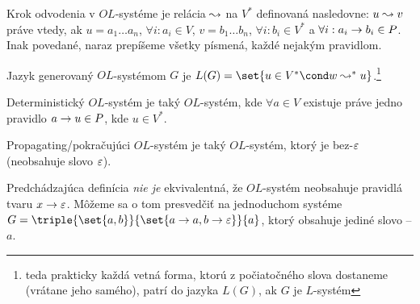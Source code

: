 \begin{definicia}
  Krok odvodenia v $OL$-systéme je relácia $\leadsto$ na $V^{*}$ definovaná
  nasledovne: $u \leadsto v$ práve vtedy, ak $u = a_{1} \dots a_{n}$,
  $\forall i: a_{i} \in V$, $v = b_{1} \dots b_{n}$, 
  $\forall i: b_{i} \in V^{*}$ a 
  $\forall i: a_{i} \rightarrow b_{i} \in P$. 
  Inak povedané, naraz prepíšeme všetky písmená, každé nejakým
  pravidlom.
\end{definicia}

\begin{definicia}
  Jazyk generovaný $OL$-systémom $G$ je 
  $L(G) = \set{u \in V^{*} \cond w \odvodenie^{*} u}$.\footnote{
    teda prakticky každá vetná forma,
    ktorú z počiatočného slova dostaneme (vrátane jeho samého),
    patrí do jazyka $L(G)$, ak $G$ je $L$-systém
  }
\end{definicia}

\begin{definicia}
  Deterministický $OL$-systém je taký $OL$-systém,
  kde $\forall a \in V$ existuje práve jedno pravidlo
  ${a \rightarrow u} \in P$, kde $u \in V^*$.
\end{definicia}

\begin{definicia}
  Propagating/pokračujúci $OL$-systém je taký $OL$-systém, ktorý
  je bez-$\varepsilon$ (neobsahuje slovo $\varepsilon$).
\end{definicia}

\begin{poznamka}
  Predchádzajúca definícia \emph{nie je} ekvivalentná, že
  $OL$-systém neobsahuje pravidlá tvaru $x \rightarrow \varepsilon$.
  Môžeme sa o tom presvedčiť na jednoduchom systéme
  $G=\triple{\set{a, b}}{\set{a \pravidlo a, b \pravidlo \eps}}{a}$, ktorý
  obsahuje jediné slovo -- $a$.
\end{poznamka}


